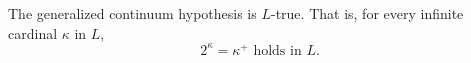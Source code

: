 The generalized continuum hypothesis is $L$-true. That is, for every infinite cardinal $\kappa$ in $L$,
$$2^\kappa = \kappa^+ \text{ holds in } L.$$